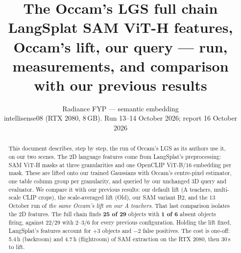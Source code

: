 \documentclass[11pt,a4paper]{article}
\title{\textbf{The Occam's LGS full chain}\\[2pt]
\large LangSplat SAM ViT-H features, Occam's lift, our query --- run, measurements, and comparison with our previous results}
\author{Radiance FYP --- semantic embedding\\ \small intellisense08 (RTX 2080, 8\,GB). Run 13--14 October 2026; report 16 October 2026}
\date{}
\begin{document}
\maketitle

\begin{abstract}
\noindent This document describes, step by step, the run of Occam's LGS as its authors use it, on our two scenes. The
2D language features come from LangSplat's preprocessing: SAM ViT-H masks at three granularities and one OpenCLIP
ViT-B/16 embedding per mask. These are lifted onto our trained Gaussians with Occam's centre-pixel estimator, one table
column group per granularity, and queried by our unchanged 3D query and evaluator. We compare it with our previous
results: our default lift (A teachers, multi-scale CLIP crops), the scale-averaged lift (Old), our SAM variant B2, and
the 13 October run of \emph{the same Occam's lift on our A teachers}. That last comparison isolates the 2D features. The
full chain finds \textbf{25 of 29} objects with \textbf{1 of 6} absent objects firing, against 22/29 with 2--3/6 for every
previous configuration. Holding the lift fixed, LangSplat's features account for +3 objects and $-2$ false positives. The
cost is one-off: 5.4\,h (backroom) and 4.7\,h (flightroom) of SAM extraction on the RTX 2080, then 30\,s to lift.
\end{abstract}

\tableofcontents
\clearpage

\end{document}
